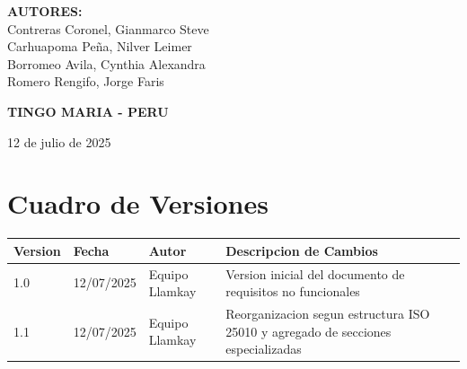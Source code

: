 \documentclass[12pt, a4paper]{article}
\begin{document}
\begin{titlepage}
    \vspace{1cm}

    \begin{flushleft}
        \hspace{2cm}\textbf{AUTORES:}\\[0.2cm]
        \hspace{3cm} Contreras Coronel, Gianmarco Steve \\[0.1cm]
        \hspace{3cm} Carhuapoma Peña, Nilver Leimer \\[0.1cm]
        \hspace{3cm} Borromeo Avila, Cynthia Alexandra \\[0.1cm]
        \hspace{3cm} Romero Rengifo, Jorge Faris \\[0.1cm]
    \end{flushleft}

    \vfill

    {\bfseries\normalsize TINGO MARIA - PERU\par}
    {\normalsize 12 de julio de 2025\par}

\end{titlepage}

\newpage
\setcounter{page}{2}
\tableofcontents
\newpage

\section{Cuadro de Versiones}

\begin{longtable}{|p{2cm}|p{2.5cm}|p{3cm}|p{6cm}|}
\hline
\textbf{Version} & \textbf{Fecha} & \textbf{Autor} & \textbf{Descripcion de Cambios} \\
\hline
\endhead

1.0 & 12/07/2025 & Equipo Llamkay & Version inicial del documento de requisitos no funcionales \\
\hline
1.1 & 12/07/2025 & Equipo Llamkay & Reorganizacion segun estructura ISO 25010 y agregado de secciones especializadas \\
\hline
\end{longtable}
\end{document}
